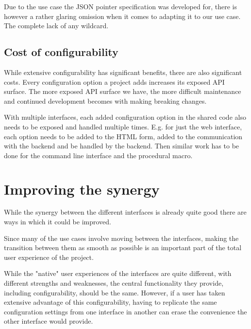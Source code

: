 
Due to the use case the JSON pointer specification was developed for, there is however a rather glaring omission when it comes to adapting it to our use case. The complete lack of any wildcard.


\subsection{Cost of configurability}

While extensive configurability has significant benefits, there are also significant costs. Every configuration option a project adds increases its exposed API surface. The more exposed API surface we have, the more difficult maintenance and continued development becomes with making breaking changes.

With multiple interfaces, each added configuration option in the shared code also needs to be exposed and handled multiple times. E.g. for just the web interface, each option needs to be added to the HTML form, added to the communication with the backend and be handled by the backend. Then similar work has to be done for the command line interface and the procedural macro.



\section{Improving the synergy}
\label{sec:improving-synergy}

While the synergy between the different interfaces is already quite good there are ways in which it could be improved.

Since many of the use cases involve moving between the interfaces, making the transition between them as smooth as possible is an important part of the total user experience of the project.

While the "native" user experiences of the interfaces are quite different, with different strengths and weaknesses, the central functionality they provide, including configurability, should be the same. However, if a user has taken extensive advantage of this configurability, having to replicate the same configuration settings from one interface in another can erase the convenience the other interface would provide.

